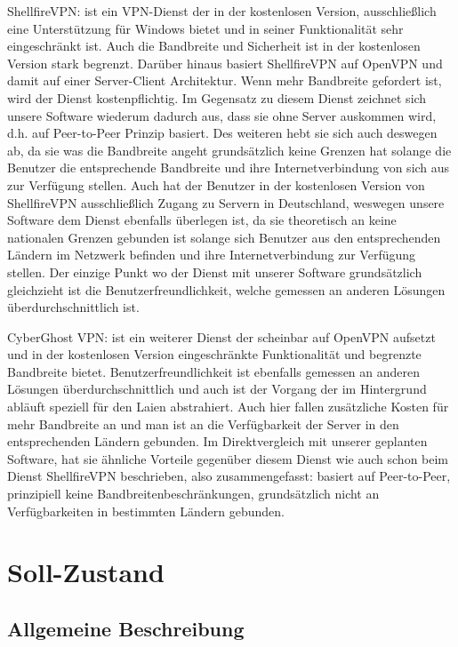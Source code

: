 \documentclass[a4paper,12pt]{scrreprt}
\begin{document}
	ShellfireVPN: ist ein VPN-Dienst der in der kostenlosen Version, ausschließlich eine Unterstützung für Windows bietet und in seiner Funktionalität sehr eingeschränkt ist. Auch die Bandbreite und Sicherheit ist in der kostenlosen Version stark begrenzt. Darüber hinaus basiert ShellfireVPN auf OpenVPN und damit auf einer Server-Client Architektur. Wenn mehr Bandbreite gefordert ist, wird der Dienst kostenpflichtig. Im Gegensatz zu diesem Dienst zeichnet sich unsere Software wiederum dadurch aus, dass sie ohne Server auskommen wird, d.h. auf Peer-to-Peer Prinzip basiert. Des weiteren hebt sie sich auch deswegen ab, da sie was die Bandbreite angeht grundsätzlich keine Grenzen hat solange die Benutzer die entsprechende Bandbreite und ihre Internetverbindung von sich aus zur Verfügung stellen. Auch hat der Benutzer in der kostenlosen Version von ShellfireVPN ausschließlich Zugang zu Servern in Deutschland, weswegen unsere Software dem Dienst ebenfalls überlegen ist, da sie theoretisch an keine nationalen Grenzen gebunden ist solange sich Benutzer aus den entsprechenden Ländern im Netzwerk befinden und ihre Internetverbindung zur Verfügung stellen. Der einzige Punkt wo der Dienst mit unserer Software grundsätzlich gleichzieht ist die Benutzerfreundlichkeit, welche gemessen an anderen Lösungen überdurchschnittlich ist.
	
	CyberGhost VPN: ist ein weiterer Dienst der scheinbar auf OpenVPN aufsetzt und in der kostenlosen Version eingeschränkte Funktionalität und begrenzte Bandbreite bietet. Benutzerfreundlichkeit ist ebenfalls gemessen an anderen Lösungen überdurchschnittlich und auch ist der Vorgang der im Hintergrund abläuft speziell für den Laien abstrahiert. Auch hier fallen zusätzliche Kosten für mehr Bandbreite an und man ist an die Verfügbarkeit der Server in den entsprechenden Ländern gebunden. Im Direktvergleich mit unserer geplanten Software, hat sie ähnliche Vorteile gegenüber diesem Dienst wie auch schon beim Dienst ShellfireVPN beschrieben, also zusammengefasst: basiert auf Peer-to-Peer, prinzipiell keine Bandbreitenbeschränkungen, grundsätzlich nicht an Verfügbarkeiten in bestimmten Ländern gebunden.
	
		
	\section{Soll-Zustand}
		
		\subsection{Allgemeine Beschreibung}
		
\end{document}
